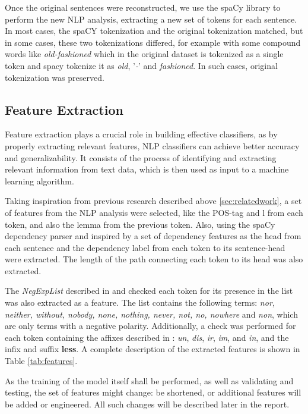 Once the original sentences were reconstructed, we use the spaCy library to perform the new NLP analysis, extracting a new set of tokens for each sentence. In most cases, the spaCY tokenization and the original tokenization matched, but in some cases, these two tokenizations differed, for example with some compound words like \textit{old-fashioned} which in the original dataset is tokenized as a single token and spacy tokenize it as \textit{old}, '\textit{-}' and \textit{fashioned}. In such cases, original tokenization was preserved. 

\subsection*{Feature Extraction \label{sec:featureextraction}}

Feature extraction plays a crucial role in building effective classifiers, as by properly extracting relevant features, NLP classifiers can achieve better accuracy and generalizability. It consists of the process of identifying and extracting relevant information from text data, which is then used as input to a machine learning algorithm.

Taking inspiration from previous research described above \ref{sec:relatedwork}, a set of features from the NLP analysis were selected, like the POS-tag and l from each token, and also the lemma from the previous token. Also, using the spaCy dependency parser and inspired by \cite{jimenez2020detecting} a set of dependency features as the head from each sentence and the dependency label from each token to its sentence-head were extracted. The length of the path connecting each token to its head was also extracted. 

The \textit{NegExpList} described in \cite{chowdhury2012fbk} and checked each token for its presence in the list was also extracted as a feature. The list contains the following terms: \textit{nor, neither, without, nobody, none, nothing, never, not, no, nowhere} and  \textit{non}, which are only terms with a negative polarity. Additionally, a check was performed for each token containing the affixes described in \cite{lapponi2012uio}: \textit{un}, \textit{dis}, \textit{ir}, \textit{im}, and \textit{in}, and the infix and suffix \textbf{less}. A complete description of the extracted features is shown in Table \ref{tab:features}.

As the training of the model itself shall be performed, as well as validating and testing, the set of features might change: be shortened, or additional features will be added or engineered. All such changes will be described later in the report. 

